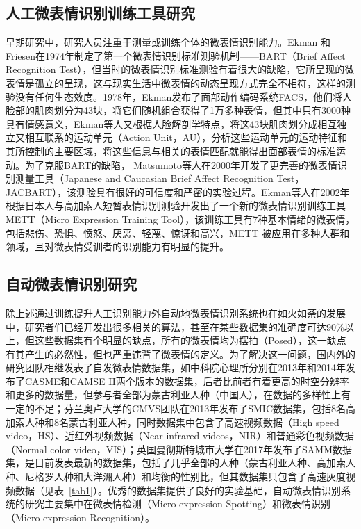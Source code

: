 \subsection{人工微表情识别训练工具研究}

早期研究中，研究人员注重于测量或训练个体的微表情识别能力。Ekman 和Friesen在1974年制定了第一个微表情识别标准测验机制——BART（Brief Affect Recognition Test），但当时的微表情识别标准测验有着很大的缺陷，它所呈现的微表情是孤立的呈现，这与现实生活中微表情的动态呈现方式完全不相符，这样的测验没有任何生态效度\citep{Ekman1974Detecting, 殷明2016微表情}。1978年，Ekman发布了面部动作编码系统FACS，他们将人脸部的肌肉划分为43块，将它们随机组合获得了1万多种表情，但其中只有3000种具有情感意义，Ekman等人又根据人脸解剖学特点，将这43块肌肉划分成相互独立又相互联系的运动单元（Action Unit，AU），分析这些运动单元的运动特征和其所控制的主要区域，将这些信息与相关的表情匹配就能得出面部表情的标准运动。为了克服BART的缺陷， Matsumoto等人在2000年开发了更完善的微表情识别测量工具（Japanese and Caucasian Brief Affect Recognition Test，JACBART），该测验具有很好的可信度和严密的实验过程\citep{Matsumoto2000A}。Ekman等人在2002年根据日本人与高加索人短暂表情识别测验开发出了一个新的微表情识别训练工具METT（Micro Expression Training Tool），该训练工具有7种基本情绪的微表情，包括悲伤、恐惧、愤怒、厌恶、轻蔑、惊讶和高兴，METT 被应用在多种人群和领域，且对微表情受训者的识别能力有明显的提升\citep{ekman2003mett}。

\subsection{自动微表情识别研究}

除上述通过训练提升人工识别能力外自动地微表情识别系统也在如火如荼的发展中，研究者们已经开发出很多相关的算法，甚至在某些数据集的准确度可达90\%以上，但这些数据集有个明显的缺点，所有的微表情均为摆拍（Posed），这一缺点有其产生的必然性，但也严重违背了微表情的定义。为了解决这一问题，国内外的研究团队相继发表了自发微表情数据集，如中科院心理所分别在2013年和2014年发布了CASME\citep{Yan2013CASME}和CAMSE II\citep{Yan2014CASME}两个版本的数据集，后者比前者有着更高的时空分辨率和更多的数据量，但参与者全部为蒙古利亚人种（中国人），在数据的多样性上有一定的不足；芬兰奥卢大学的CMVS团队在2013年发布了SMIC数据集\citep{Li2013A}，包括8名高加索人种和8名蒙古利亚人种，同时数据集中包含了高速视频数据（High speed video，HS）、近红外视频数据（Near infrared videos，NIR）和普通彩色视频数据（Normal color video，VIS）；英国曼彻斯特城市大学在2017年发布了SAMM数据集\citep{Davison2018SAMM}，是目前发表最新的数据集，包括了几乎全部的人种（蒙古利亚人种、高加索人种、尼格罗人种和大洋洲人种）和均衡的性别比，但其数据集只包含了高速灰度视频数据（见表~\ref{tab1}）。优秀的数据集提供了良好的实验基础，自动微表情识别系统的研究主要集中在微表情检测（Micro-expression Spotting）和微表情识别（Micro-expression Recognition）。

